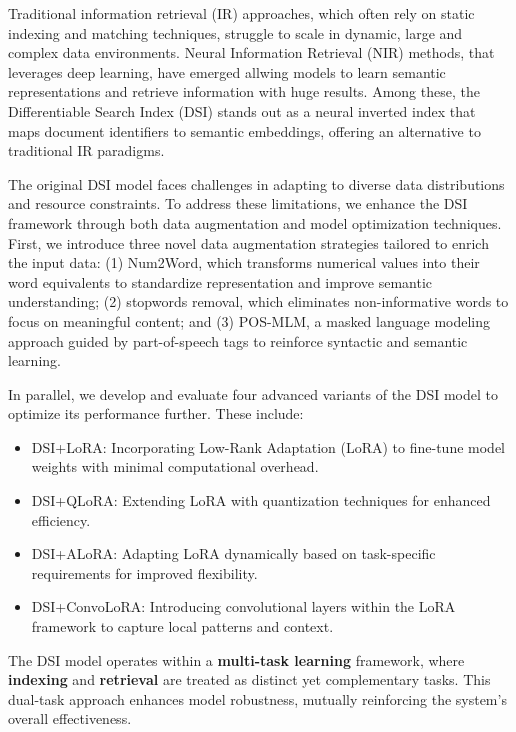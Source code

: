 Traditional information retrieval (IR) approaches, which often rely on static indexing and matching techniques, struggle to scale in dynamic, large and complex data environments. Neural Information Retrieval (NIR) methods, that leverages deep learning, have emerged allwing models to learn semantic representations and retrieve information with huge results. Among these, the Differentiable Search Index (DSI) stands out as a neural inverted index that maps document identifiers to semantic embeddings, offering an alternative to traditional IR paradigms.


The original DSI model faces challenges in adapting to diverse data distributions and resource constraints. To address these limitations, we enhance the DSI framework through both data augmentation and model optimization techniques. First, we introduce three novel data augmentation strategies tailored to enrich the input data: (1) Num2Word, which transforms numerical values into their word equivalents to standardize representation and improve semantic understanding; (2) stopwords removal, which eliminates non-informative words to focus on meaningful content; and (3) POS-MLM, a masked language modeling approach guided by part-of-speech tags to reinforce syntactic and semantic learning.

In parallel, we develop and evaluate four advanced variants of the DSI model to optimize its performance further. These include:
\begin{itemize}
    \item DSI+LoRA: Incorporating Low-Rank Adaptation (LoRA)\cite{hu2021loralowrankadaptationlarge} to fine-tune model weights with minimal computational overhead.
    \item DSI+QLoRA: Extending LoRA with quantization techniques \cite{dettmers2023qloraefficientfinetuningquantized} for enhanced efficiency.
    \item DSI+ALoRA: Adapting LoRA \cite{liu2024aloraallocatinglowrankadaptation} dynamically based on task-specific requirements for improved flexibility.
    \item DSI+ConvoLoRA: Introducing convolutional layers within the LoRA \cite{aleem2024convloraadabnbaseddomain} framework to capture local patterns and context.
\end{itemize}

The DSI model operates within a \textbf{multi-task learning} framework, where \textbf{indexing} and \textbf{retrieval} are treated as distinct yet complementary tasks. This dual-task approach enhances model robustness, mutually reinforcing the system's overall effectiveness.
